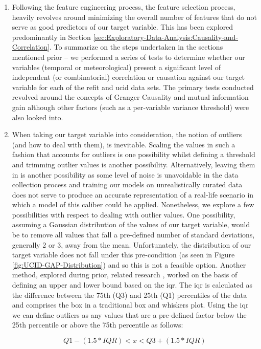 \begin{adjustwidth}{-1.65cm}{-0.0cm}
\begin{enumerate}[label=Step 3.\arabic*:, leftmargin=*]
    \item Following the feature engineering process, the feature selection process, heavily revolves around minimizing the overall number of features that do not serve as good predictors of our target variable. This has been explored predominantly in Section \ref{sec:Exploratory-Data-Analysis:Causality-and-Correlation}. To summarize on the steps undertaken in the sections mentioned prior -- we performed a series of tests to determine whether our variables (temporal or meteorological) present a significant level of independent (or combinatorial) correlation or causation against our target variable for each of the \gls{refit} and \gls{ucid} data sets. The primary tests conducted revolved around the concepts of Granger Causality and mutual information gain although other factors (such as a per-variable variance threshold) were also looked into.
    
    \item When taking our target variable into consideration, the notion of outliers (and how to deal with them), is inevitable. Scaling the values in such a fashion that accounts for outliers is one possibility whilst defining a threshold and trimming outlier values is another possibility. Alternatively, leaving them in is another possibility as some level of noise is unavoidable in the data collection process and training our models on unrealistically curated data does not serve to produce an accurate representation of a real-life scenario in which a model of this caliber could be applied. Nonetheless, we explore a few possibilities with respect to dealing with outlier values. One possibility, assuming a Gaussian distribution of the values of our target variable, would be to remove all values that fall a pre-defined number of standard deviations, generally 2 or 3, away from the mean. Unfortunately, the distribution of our target variable does not fall under this pre-condition (as seen in Figure \ref{fig:UCID-GAP-Distribution}) and so this is not a feasible option. Another method, explored during prior, related research \cite{Kareem}, worked on the basis of defining an upper and lower bound based on the \gls{iqr}. The \gls{iqr} is calculated as the difference between the 75th (Q3) and 25th (Q1) percentiles of the data and comprises the box in a traditional box and whiskers plot. Using the \gls{iqr} we can define outliers as any values that are a pre-defined factor below the 25th percentile or above the 75th percentile as follows:
    
    \begin{equation}
        Q1 - (1.5 * IQR) < x < Q3 + (1.5 * IQR)
    \label{eq:IQR-Outliers}
    \end{equation}
    

\end{enumerate}
\end{adjustwidth}
